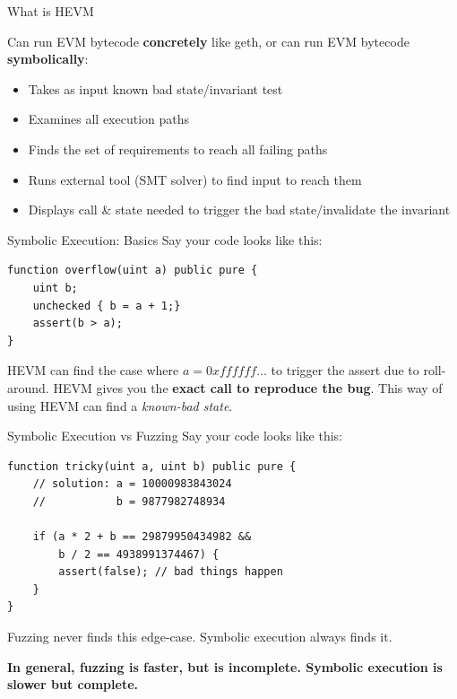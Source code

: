 \documentclass{beamer}
\begin{document}
\begin{frame}{What is HEVM}

Can run EVM bytecode \textbf{concretely} like geth, or can run EVM bytecode \textbf{symbolically}:
\begin{itemize}
\item Takes as input known bad state/invariant test
\item Examines all execution paths
\item Finds the set of requirements to reach all failing paths
\item Runs external tool (SMT solver) to find input to reach them
\item Displays call \& state needed to trigger the bad state/invalidate the invariant
\end{itemize}
\end{frame}

\begin{frame}[fragile=singleslide]{Symbolic Execution: Basics}
Say your code looks like this:
\begin{Verbatim}[frame=single, framerule=0.2mm, framesep=2mm,fontsize=\small]
function overflow(uint a) public pure {
	uint b;
	unchecked { b = a + 1;}
	assert(b > a);
}
\end{Verbatim}


HEVM can find the case where $a=0xffffff\ldots$ to trigger the assert due to roll-around. HEVM gives you the \textbf{exact call to reproduce the bug}. This way of using HEVM can find a \emph{known-bad state}.

\end{frame}

\begin{frame}[fragile=singleslide]{Symbolic Execution vs Fuzzing}
Say your code looks like this:

\begin{Verbatim}[frame=single, framerule=0.2mm, framesep=2mm,fontsize=\small]
function tricky(uint a, uint b) public pure {
	// solution: a = 10000983843024
	//           b = 9877982748934
	
	if (a * 2 + b == 29879950434982 &&
	    b / 2 == 4938991374467) {
		assert(false); // bad things happen
	}
}
\end{Verbatim}

Fuzzing never finds this edge-case. Symbolic execution always finds it.
\bigskip 

\textbf{In general, fuzzing is faster, but is incomplete. Symbolic execution is slower but complete.}

\end{frame}
\end{document}
